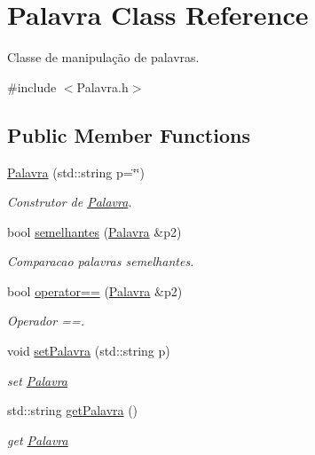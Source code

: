 \hypertarget{classPalavra}{}\section{Palavra Class Reference}
\label{classPalavra}


Classe de manipulação de palavras.  




{\ttfamily \#include $<$Palavra.\+h$>$}

\subsection*{Public Member Functions}
\begin{DoxyCompactItemize}
\item 
\hyperlink{classPalavra_a81db9f79dee404bfd73fe9fc9f861be3}{Palavra} (std\+::string p=\char`\"{}\char`\"{})
\begin{DoxyCompactList}\small\item\em Construtor de \hyperlink{classPalavra}{Palavra}. \end{DoxyCompactList}\item 
bool \hyperlink{classPalavra_ae3c7cea7ef6603efb3899adc34dba9d8}{semelhantes} (\hyperlink{classPalavra}{Palavra} \&p2)
\begin{DoxyCompactList}\small\item\em Comparacao palavras semelhantes. \end{DoxyCompactList}\item 
bool \hyperlink{classPalavra_a0db696a5fd0261a07d35d367a114afa7}{operator==} (\hyperlink{classPalavra}{Palavra} \&p2)
\begin{DoxyCompactList}\small\item\em Operador ==. \end{DoxyCompactList}\item 
void \hyperlink{classPalavra_a77fbc808d5749f73a2974b7276a0d000}{set\+Palavra} (std\+::string p)
\begin{DoxyCompactList}\small\item\em set \hyperlink{classPalavra}{Palavra} \end{DoxyCompactList}\item 
std\+::string \hyperlink{classPalavra_a08bfe271e5e30c04f711fcf94609ab9a}{get\+Palavra} ()
\begin{DoxyCompactList}\small\item\em get \hyperlink{classPalavra}{Palavra} \end{DoxyCompactList}\end{DoxyCompactItemize}


